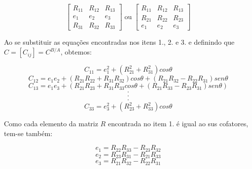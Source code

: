 \begin{equation}\begin{bmatrix}
R_{11} & R_{12} &R_{13} \\
e_1 & e_2 & e_3 \\
R_{31} & R_{32}  & R_{33}
\end{bmatrix} \; \text{ou}\;  \begin{bmatrix}
R_{11} & R_{12} &R_{13} \\
R_{21} & R_{22} & R_{23} \\
e_1 & e_2  & e_3
\end{bmatrix} \end{equation}

Ao se substituir as equações encontradas nos itens 1., 2. e 3. e definindo que \begin{math} C=[C_{ij}]=C^{B/A} \end{math}, obtemos:

\begin{equation}C_{11}=e_1^2+(R_{21}^2+R_{31}^2)cos \theta\end{equation}
\begin{equation}C_{12}=e_1e_2+(R_{21}R_{22}+R_{31}R_{32})cos\theta+(R_{21}R_{32}-R_{22}R_{31})sen\theta\end{equation}
\begin{equation}C_{13}=e_1e_3+(R_{21}R_{23}+R_{31}R_{33}cos\theta+(R_{21}R_{33}-R_{23}R_{31})sen\theta)\end{equation}
\begin{equation} \begin{matrix} .\\.\\.\end{matrix}\end{equation}
\begin{equation}C_{33}=e_3^2+(R_{23}^2+R_{33}^2)cos\theta\end{equation}

Como cada elemento da matriz \begin{math} R\end{math} encontrada no item 1. é igual ao sus cofatores, tem-se também:

\begin{equation}e_1=R_{22}R_{33}-R_{23}R_{32}\end{equation}
\begin{equation}e_2=R_{23}R_{31}-R_{21}R_{33}\end{equation}
\begin{equation}e_3=R_{21}R_{32}-R_{22}R_{31}\end{equation}


